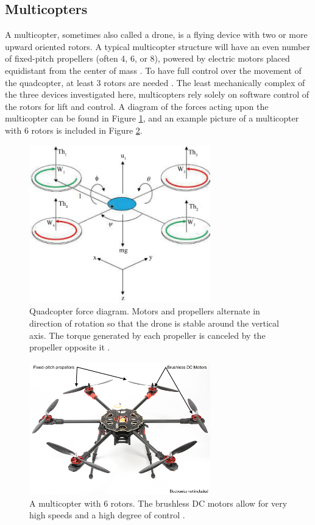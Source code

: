 \subsection{Multicopters}
A multicopter, sometimes also called a drone, is a flying device with two or more upward oriented rotors. A typical multicopter structure will have an even number of fixed-pitch propellers (often 4, 6, or 8), powered by electric motors placed equidistant from the center of mass \cite{multicopter_background}. To have full control over the movement of the quadcopter, at least 3 rotors are needed \cite{multicopter_dynamics_2}. The least mechanically complex of the three devices investigated here, multicopters rely solely on software control of the rotors for lift and control. A diagram of the forces acting upon the multicopter can be found in Figure \ref{fig:quad_diagram}, and an example picture of a multicopter with 6 rotors is included in Figure \ref{fig:multicopter_hex}.\par
\begin{figure}[ht]
\centering
\includegraphics[width=0.70\textwidth]{img/quad_force_diagram.jpg}
\caption{Quadcopter force diagram. Motors and propellers alternate in direction of rotation so that the drone is stable around the vertical axis. The torque generated by each propeller is canceled by the propeller opposite it \cite{multicopter_dynamics_3}.}
\label{fig:quad_diagram}
\end{figure}\par
\begin{figure}[ht]
\centering
\includegraphics[width=0.70\textwidth]{img/hexacopter.jpg}
\caption{A multicopter with 6 rotors. The brushless DC motors allow for very high speeds and a high degree of control \cite{multicopter_img}.}
\label{fig:multicopter_hex}
\end{figure}\par
